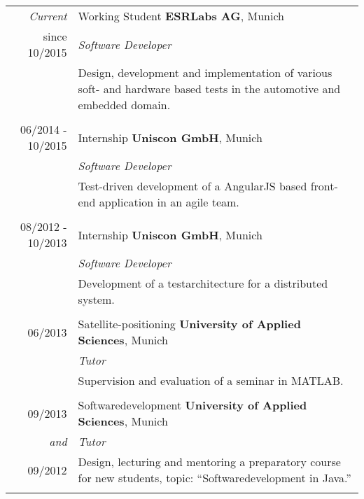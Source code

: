\documentclass[a4paper,10pt]{article} %
\begin{document}
\begin{tabular}{r|p{11cm}}
        \textit{Current}        & Working Student \textbf{ESRLabs AG}, Munich\\
since \textsc{10/2015}          & \emph{Software Developer} \\
                                & \small{Design, development and implementation of various soft- and hardware based tests in the automotive and embedded domain.} \\
\multicolumn{2}{c}{} \\
 
\textsc{06/2014 - 10/2015}      & Internship \textbf{Uniscon GmbH}, Munich\\
                                & \emph{Software Developer} \\
                                & \small{Test-driven development of a AngularJS based front-end application in an agile team.} \\
\multicolumn{2}{c}{} \\

 \textsc{08/2012 - 10/2013}     & Internship \textbf{Uniscon GmbH}, Munich\\
           		        & \emph{Software Developer}\\
                                & \small{Development of a testarchitecture for a distributed system.} \\
\multicolumn{2}{c}{} \\
 
 
\textsc{06/2013}           & Satellite-positioning \textbf{University of Applied Sciences}, Munich \\
                           & \emph{Tutor}\\
                           & \small{Supervision and evaluation of a seminar in MATLAB.}\\
\multicolumn{2}{c}{} \\
 
\textsc{09/2013}           & Softwaredevelopment \textbf{University of Applied Sciences}, Munich \\
\emph{and}                 & \emph{Tutor}\\
\textsc{09/2012}           & \small{Design, lecturing and mentoring a preparatory course for new students, topic: ``Softwaredevelopment in Java.''}\\
\multicolumn{2}{c}{} \\
 

\end{tabular}
\end{document}
